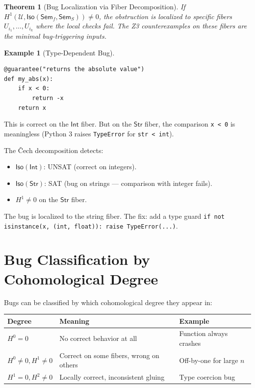 \documentclass[11pt,a4paper]{report}
\theoremstyle{definition}
\newtheorem{example}[definition]{Example}
\theoremstyle{plain}
\newtheorem{theorem}[definition]{Theorem}
\newcommand{\covers}{\mathcal{U}}
\newcommand{\Sem}{\mathsf{Sem}}
\newcommand{\Iso}{\mathsf{Iso}}
\newcommand{\Hzero}{H^0}
\newcommand{\Hone}{H^1}
\newcommand{\Htwo}{H^2}
\begin{document}
\begin{theorem}[Bug Localization via Fiber Decomposition]
If $\Hone(\covers, \Iso(\Sem_f, \Sem_S)) \neq 0$, the obstruction
is localized to specific fibers $U_{i_1}, \ldots, U_{i_k}$ where
the local checks fail.  The Z3 counterexamples on these fibers are
the \emph{minimal bug-triggering inputs}.
\end{theorem}

\begin{example}[Type-Dependent Bug]
\begin{lstlisting}
@guarantee("returns the absolute value")
def my_abs(x):
    if x < 0:
        return -x
    return x
\end{lstlisting}

This is correct on the $\mathsf{Int}$ fiber.  But on the
$\mathsf{Str}$ fiber, the comparison \texttt{x < 0} is meaningless
(Python 3 raises \texttt{TypeError} for \texttt{str < int}).

The \v{C}ech decomposition detects:
\begin{itemize}
  \item $\Iso(\mathsf{Int})$: UNSAT (correct on integers).
  \item $\Iso(\mathsf{Str})$: SAT (bug on strings --- comparison
    with integer fails).
  \item $\Hone \neq 0$ on the $\mathsf{Str}$ fiber.
\end{itemize}

The bug is localized to the string fiber.  The fix: add a type guard
\texttt{if not isinstance(x, (int, float)): raise TypeError(...)}.
\end{example}

\section{Bug Classification by Cohomological Degree}

Bugs can be classified by which cohomological degree they appear in:

\begin{center}
\begin{tabular}{l l l}
  \textbf{Degree} & \textbf{Meaning} & \textbf{Example} \\
  \hline
  $\Hzero = 0$ & No correct behavior at all &
    Function always crashes \\
  $\Hzero \neq 0, \Hone \neq 0$ &
    Correct on some fibers, wrong on others &
    Off-by-one for large $n$ \\
  $\Hone = 0, \Htwo \neq 0$ &
    Locally correct, inconsistent gluing &
    Type coercion bug \\
\end{tabular}
\end{center}
\end{document}
